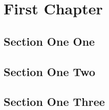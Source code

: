 \documentclass{report}
\begin{document}
\chapter{First Chapter}
\section{Section One One}
\section{Section One Two}
\section{Section One Three}
\end{document}
